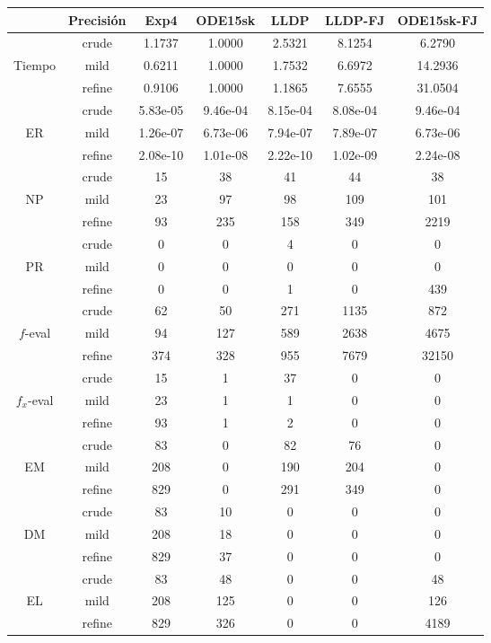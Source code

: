 \begin{table}[htb]
	\centering
\begin{tabular}{ |c|c|c|c|c|c|c| }
\hline
 & Precisi\'on & Exp4 & ODE15sk & LLDP & LLDP-FJ & ODE15sk-FJ \\
\hline
  & crude & 1.1737 & 1.0000 & 2.5321 & 8.1254 & 6.2790 \\
 Tiempo  & mild & 0.6211 & 1.0000 & 1.7532 & 6.6972 & 14.2936 \\
  & refine & 0.9106 & 1.0000 & 1.1865 & 7.6555 & 31.0504 \\
\hline
  & crude & 5.83e-05 & 9.46e-04 & 8.15e-04 & 8.08e-04 & 9.46e-04 \\
 ER  & mild & 1.26e-07 & 6.73e-06 & 7.94e-07 & 7.89e-07 & 6.73e-06 \\
  & refine & 2.08e-10 & 1.01e-08 & 2.22e-10 & 1.02e-09 & 2.24e-08 \\
\hline
  & crude & 15 & 38 & 41 & 44 & 38 \\
 NP  & mild & 23 & 97 & 98 & 109 & 101 \\
  & refine & 93 & 235 & 158 & 349 & 2219 \\
\hline
  & crude & 0 & 0 & 4 & 0 & 0 \\
 PR  & mild & 0 & 0 & 0 & 0 & 0 \\
  & refine & 0 & 0 & 1 & 0 & 439 \\
\hline
  & crude & 62 & 50 & 271 & 1135 & 872 \\
 $f$-eval  & mild & 94 & 127 & 589 & 2638 & 4675 \\
  & refine & 374 & 328 & 955 & 7679 & 32150 \\
\hline
  & crude & 15 & 1 & 37 & 0 & 0 \\
 $f_x$-eval  & mild & 23 & 1 & 1 & 0 & 0 \\
  & refine & 93 & 1 & 2 & 0 & 0 \\
\hline
  & crude & 83 & 0 & 82 & 76 & 0 \\
 EM  & mild & 208 & 0 & 190 & 204 & 0 \\
  & refine & 829 & 0 & 291 & 349 & 0 \\
\hline
  & crude & 83 & 10 & 0 & 0 & 0 \\
 DM  & mild & 208 & 18 & 0 & 0 & 0 \\
  & refine & 829 & 37 & 0 & 0 & 0 \\
\hline
  & crude & 83 & 48 & 0 & 0 & 48 \\
 EL  & mild & 208 & 125 & 0 & 0 & 126 \\
  & refine & 829 & 326 & 0 & 0 & 4189 \\

\end{tabular}
\end{table}
